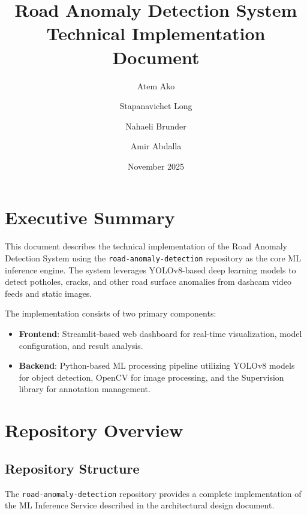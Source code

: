 \documentclass[12pt]{article}
\title{Road Anomaly Detection System\\Technical Implementation Document}
\author{
  Atem Ako \and
  Stapanavichet Long \and
  Nahaeli Brunder \and
  Amir Abdalla
}
\date{November 2025}
\begin{document}
\maketitle

\tableofcontents
\clearpage

\section{Executive Summary}

This document describes the technical implementation of the Road Anomaly Detection System using the \texttt{road-anomaly-detection} repository as the core ML inference engine. The system leverages YOLOv8-based deep learning models to detect potholes, cracks, and other road surface anomalies from dashcam video feeds and static images.

\medskip

The implementation consists of two primary components:

\begin{itemize}
    \item \textbf{Frontend}: Streamlit-based web dashboard for real-time visualization, model configuration, and result analysis.
    \item \textbf{Backend}: Python-based ML processing pipeline utilizing YOLOv8 models for object detection, OpenCV for image processing, and the Supervision library for annotation management.
\end{itemize}

\section{Repository Overview}

\subsection{Repository Structure}

The \texttt{road-anomaly-detection} repository provides a complete implementation of the ML Inference Service described in the architectural design document.
\end{document}
